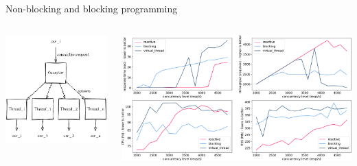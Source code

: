\documentclass{beamer}
\begin{document}
\begin{frame}{Non-blocking and blocking programming}
    \begin{columns}
        \begin{column}{0.5\textwidth}
            \includegraphics[width=\textwidth]{assets/acceptor_system.png}
        \end{column}
        \begin{column}{0.5\textwidth}
            \includegraphics[width=\textwidth]{assets/nano_200_19.0.1.png}
        \end{column}
    \end{columns}
\end{frame}
\end{document}
